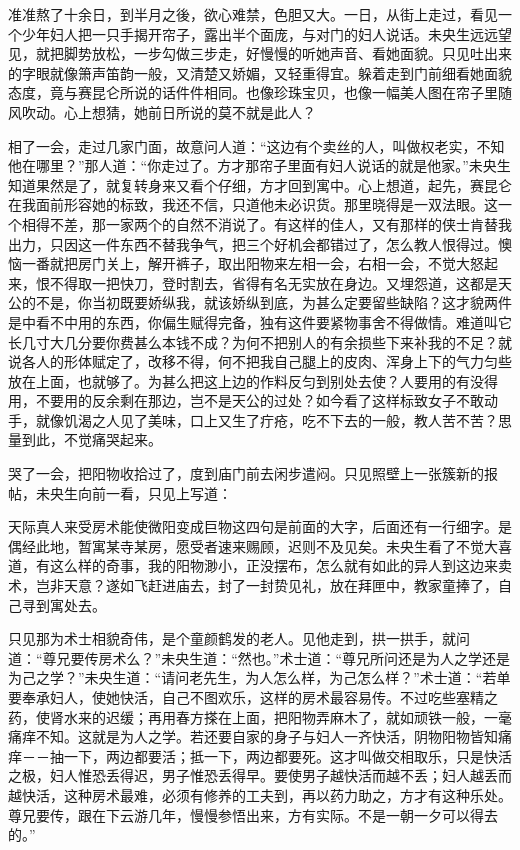 \documentclass[a4paper,12pt,UTF8,twoside]{ctexbook}
\begin{document}
准准熬了十余日，到半月之後，欲心难禁，色胆又大。一日，从街上走过，看见一个少年妇人把一只手揭开帘子，露出半个面庞，与对门的妇人说话。未央生远远望见，就把脚势放松，一步勾做三步走，好慢慢的听她声音、看她面貌。只见吐出来的字眼就像箫声笛韵一般，又清楚又娇媚，又轻重得宜。躲着走到门前细看她面貌态度，竟与赛昆仑所说的话件件相同。也像珍珠宝贝，也像一幅美人图在帘子里随风吹动。心上想猜，她前日所说的莫不就是此人？

相了一会，走过几家门面，故意问人道：“这边有个卖丝的人，叫做权老实，不知他在哪里？”那人道：“你走过了。方才那帘子里面有妇人说话的就是他家。”未央生知道果然是了，就复转身来又看个仔细，方才回到寓中。心上想道，起先，赛昆仑在我面前形容她的标致，我还不信，只道他未必识货。那里晓得是一双法眼。这一个相得不差，那一家两个的自然不消说了。有这样的佳人，又有那样的侠士肯替我出力，只因这一件东西不替我争气，把三个好机会都错过了，怎么教人恨得过。懊恼一番就把房门关上，解开裤子，取出阳物来左相一会，右相一会，不觉大怒起来，恨不得取一把快刀，登时割去，省得有名无实放在身边。又埋怨道，这都是天公的不是，你当初既要娇纵我，就该娇纵到底，为甚么定要留些缺陷？这才貌两件是中看不中用的东西，你偏生赋得完备，独有这件要紧物事舍不得做情。难道叫它长几寸大几分要你费甚么本钱不成？为何不把别人的有余损些下来补我的不足？就说各人的形体赋定了，改移不得，何不把我自己腿上的皮肉、浑身上下的气力匀些放在上面，也就够了。为甚么把这上边的作料反匀到别处去使？人要用的有没得用，不要用的反余剩在那边，岂不是天公的过处？如今看了这样标致女子不敢动手，就像饥渴之人见了美味，口上又生了疔疮，吃不下去的一般，教人苦不苦？思量到此，不觉痛哭起来。

哭了一会，把阳物收拾过了，度到庙门前去闲步遣闷。只见照壁上一张簇新的报帖，未央生向前一看，只见上写道：

天际真人来受房术能使微阳变成巨物这四句是前面的大字，后面还有一行细字。是偶经此地，暂寓某寺某房，愿受者速来赐顾，迟则不及见矣。未央生看了不觉大喜道，有这么样的奇事，我的阳物渺小，正没摆布，怎么就有如此的异人到这边来卖术，岂非天意？遂如飞赶进庙去，封了一封贽见礼，放在拜匣中，教家童捧了，自己寻到寓处去。

只见那为术士相貌奇伟，是个童颜鹤发的老人。见他走到，拱一拱手，就问道：“尊兄要传房术么？”未央生道：“然也。”术士道：“尊兄所问还是为人之学还是为己之学？”未央生道：“请问老先生，为人怎么样，为己怎么样？”术士道：“若单要奉承妇人，使她快活，自己不图欢乐，这样的房术最容易传。不过吃些塞精之药，使肾水来的迟缓；再用春方搽在上面，把阳物弄麻木了，就如顽铁一般，一毫痛痒不知。这就是为人之学。若还要自家的身子与妇人一齐快活，阴物阳物皆知痛痒－－抽一下，两边都要活；抵一下，两边都要死。这才叫做交相取乐，只是快活之极，妇人惟恐丢得迟，男子惟恐丢得早。要使男子越快活而越不丢；妇人越丢而越快活，这种房术最难，必须有修养的工夫到，再以药力助之，方才有这种乐处。尊兄要传，跟在下云游几年，慢慢参悟出来，方有实际。不是一朝一夕可以得去的。”
\end{document}
